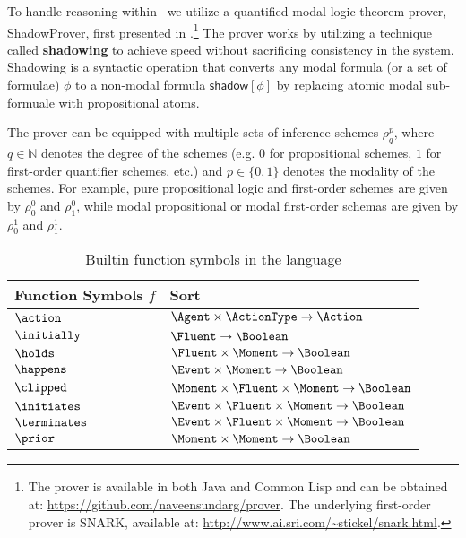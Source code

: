 
To handle reasoning within \CEC\, we utilize a quantified modal logic
theorem prover, \textsf{ShadowProver}, first presented in
\cite{nsg_sb_dde_ijcai,uncertaintyized_cognitive_calculus}.\footnote{The
  prover is available in both Java and Common Lisp and can be obtained
  at: \url{https://github.com/naveensundarg/prover}. The underlying
  first-order prover is SNARK, available at:
  \url{http://www.ai.sri.com/~stickel/snark.html}.}  The prover works
by utilizing a technique called \textbf{shadowing} to achieve speed
without sacrificing consistency in the system.  Shadowing is a
syntactic operation that converts any modal formula (or a set of
formulae) $\phi$ to a non-modal formula $\mathsf{shadow}[\phi]$ by replacing atomic
modal sub-formuale with propositional atoms.


The prover can be equipped
with multiple sets of inference schemes $\rho^p_{q}$, where
$q\in\mathbb{N}$ denotes the degree of the schemes (e.g. $0$ for
propositional schemes, $1$ for first-order quantifier schemes, etc.)
and $p\in\{0,1\}$ denotes the modality of the schemes. For example, pure
propositional logic and first-order schemes are given by $\rho^0_{0}$
and $\rho^0_{1}$, while modal
propositional or modal first-order schemas are given by $\rho^1_{0}$ and
$\rho^1_{1}$.

\begin{table}
\begin{footnotesize}
\begin{center}
\begin{tabular}{lp{10.3cm}}
\toprule
\textbf{Function Symbols} $f$& \textbf{Sort}  \\
\midrule
$\action$ & $\Agent \times \ActionType \rightarrow \Action$\\
$ \initially$ & $\Fluent \rightarrow \Boolean$\\
  $\holds$ & $ \Fluent \times \Moment \rightarrow \Boolean $\\
  $ \happens$ & $ \Event \times \Moment \rightarrow \Boolean$ \\
  $ \clipped$ & $ \Moment \times \Fluent \times \Moment \rightarrow \Boolean$ \\
  $ \initiates$ & $ \Event \times \Fluent \times \Moment \rightarrow \Boolean$\\
  $ \terminates$ & $ \Event \times \Fluent \times \Moment \rightarrow \Boolean$ \\
  $ \prior$ & $\Moment \times \Moment \rightarrow \Boolean$\\
\bottomrule
\end{tabular}
\caption{Builtin function symbols in the language}
\label{syn:defs}
\end{center}
\end{footnotesize}
\end{table}


